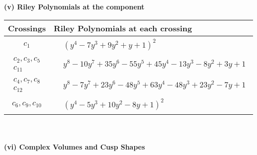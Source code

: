 \documentclass[1p]{elsarticle_modified}
\theoremstyle{definition}
\begin{document}
\newpage\renewcommand{\arraystretch}{1}
\flushleft \textbf{(v) Riley Polynomials at the component}\newline \\
\begin{tabular}{m{50pt}|m{274pt}}
Crossings & \hspace{64pt}Riley Polynomials at each crossing \\
\hline $$\begin{aligned}c_{1}\end{aligned}$$&$\begin{aligned}
&(y^4-7 y^3+9 y^2+y+1)^2
\end{aligned}$\\
\hline $$\begin{aligned}c_{2},c_{3},c_{5}\\c_{11}\end{aligned}$$&$\begin{aligned}
&y^8-10 y^7+35 y^6-55 y^5+45 y^4-13 y^3-8 y^2+3 y+1
\end{aligned}$\\
\hline $$\begin{aligned}c_{4},c_{7},c_{8}\\c_{12}\end{aligned}$$&$\begin{aligned}
&y^8-7 y^7+23 y^6-48 y^5+63 y^4-48 y^3+23 y^2-7 y+1
\end{aligned}$\\
\hline $$\begin{aligned}c_{6},c_{9},c_{10}\end{aligned}$$&$\begin{aligned}
&(y^4-5 y^3+10 y^2-8 y+1)^2
\end{aligned}$\\
\hline
\end{tabular}\\~\\
\newpage\flushleft \textbf{(vi) Complex Volumes and Cusp Shapes}
\end{document}
